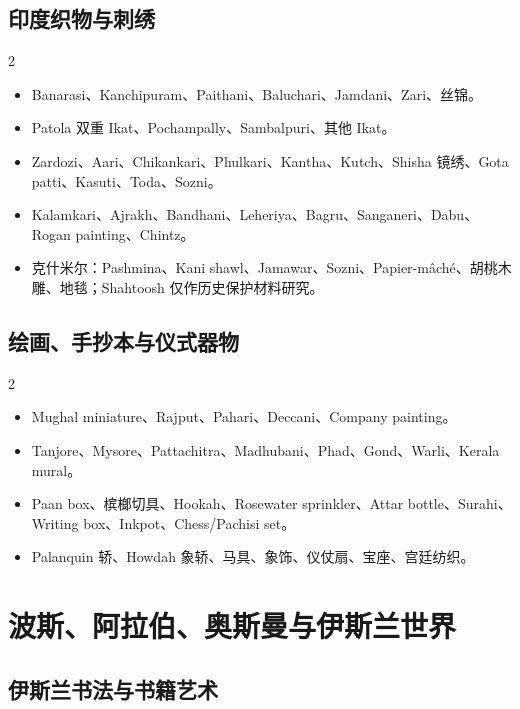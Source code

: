 \documentclass[lang=en,a4paper,11pt]{elegantpaper}
\begin{document}
\subsection{印度织物与刺绣}


\begin{multicols}{2}
\begin{itemize}
\item Banarasi、Kanchipuram、Paithani、Baluchari、Jamdani、Zari、丝锦。
\item Patola 双重 Ikat、Pochampally、Sambalpuri、其他 Ikat。
\item Zardozi、Aari、Chikankari、Phulkari、Kantha、Kutch、Shisha 镜绣、Gota patti、Kasuti、Toda、Sozni。
\item Kalamkari、Ajrakh、Bandhani、Leheriya、Bagru、Sanganeri、Dabu、Rogan painting、Chintz。
\item 克什米尔：Pashmina、Kani shawl、Jamawar、Sozni、Papier-mâché、胡桃木雕、地毯；Shahtoosh 仅作历史保护材料研究。
\end{itemize}
\end{multicols}

\subsection{绘画、手抄本与仪式器物}


\begin{multicols}{2}
\begin{itemize}
\item Mughal miniature、Rajput、Pahari、Deccani、Company painting。
\item Tanjore、Mysore、Pattachitra、Madhubani、Phad、Gond、Warli、Kerala mural。
\item Paan box、槟榔切具、Hookah、Rosewater sprinkler、Attar bottle、Surahi、Writing box、Inkpot、Chess/Pachisi set。
\item Palanquin 轿、Howdah 象轿、马具、象饰、仪仗扇、宝座、宫廷纺织。
\end{itemize}
\end{multicols}

\section{波斯、阿拉伯、奥斯曼与伊斯兰世界}


\subsection{伊斯兰书法与书籍艺术}
\end{document}
